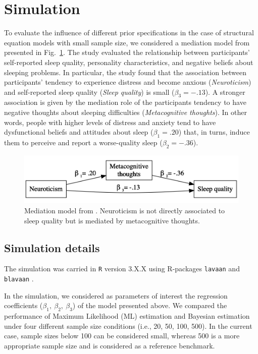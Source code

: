 \documentclass[graybox]{svmult}
\begin{document}
\section{Simulation}
\label{sec:simulation}

To evaluate the influence of different prior specifications in the case of structural equation models with small sample size, we considered a mediation model from \cite{sellaPersonalityTraitsSleep2020}  presented in Fig.~\ref{fig:example_model}. The study evaluated the relationship between participants' self-reported sleep quality, personality characteristics, and negative beliefs about sleeping problems. In particular, the study found that the association between participants' tendency to experience distress and become anxious (\emph{Neuroticism}) and self-reported sleep quality (\emph{Sleep quality}) is small ($\beta_3=-.13$).  A stronger association is given  by the mediation role of the participants tendency to have negative thoughts about sleeping difficulties (\emph{Metacognitive thoughts}). In other words, people with higher levels of distress and anxiety tend to have dysfunctional beliefs and attitudes about sleep ($\beta_1=.20$) that, in turns, induce them to perceive and report a worse-quality sleep ($\beta_2=-.36$).

\begin{figure}[b]
	\sidecaption
	\includegraphics[width = .64\textwidth]{figure/Plot_example_model}
	\caption{Mediation model from \cite{sellaPersonalityTraitsSleep2020}. Neuroticism is not directly associated to sleep quality but is mediated by metacognitive thoughts.}
	\label{fig:example_model}
\end{figure}

\subsection{Simulation details}

The simulation was carried in \texttt{R} version 3.X.X \cite{rcoreteamLanguageEnvironmentStatistical2018} using R-packages \texttt{lavaan} \cite{rosseelLavaanPackageStructural2012} and \texttt{blavaan} \cite{merkleBlavaanBayesianStructural2018}.

In the simulation, we  considered as parameters of interest the regression coefficients ($\beta_1,\ \beta_2,\ \beta_3$) of the model presented above. We compared the performance of Maximum Likelihood (ML) estimation and Bayesian estimation under four different sample size conditions (i.e., 20, 50, 100, 500). In the current case, sample sizes below 100 can be considered small, whereas 500 is a more appropriate sample size and is considered as a reference benchmark.
\end{document}
